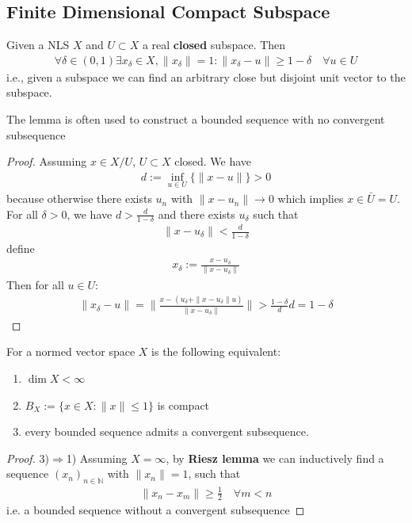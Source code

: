 \subsection{Finite Dimensional Compact Subspace}
\begin{lemma}
	Given a NLS $X$ and $U \subset X$ a real \textbf{closed} subspace. Then
	\begin{align*}
		\forall \delta \in (0, 1)\exists x_\delta \in X, \|x_\delta\| = 1: \|x_\delta - u\| \ge 1 - \delta \quad \forall u \in U
	\end{align*}
	i.e., given a subspace we can find an arbitrary close but disjoint unit vector to the subspace.
\end{lemma}
\begin{remark}
	The lemma is often used to construct a bounded sequence with no convergent subsequence
\end{remark}
\begin{proof}
	Assuming $x \in X\slash U$, $U \subset X$ closed. We have 
	\begin{align*}
		d:= \inf_{u \in U}\{\|x - u\|\} > 0
	\end{align*}
	because otherwise there exists $u_n$ with $\|x - u_n\| \rightarrow 0$ which implies $x \in \bar{U} = U$. For all $\delta > 0$, we have $d > \frac{d}{1 - \delta}$ and there exists $u_\delta$ such that
	\begin{align*}
		\|x - u_\delta\| < \frac{d}{1 - \delta}
	\end{align*}
	define 
	\begin{align*}
		x_\delta := \frac{x - u_\delta}{\|x - u_\delta\|}
	\end{align*}
	Then for all $u \in U$:
	\begin{align*}
		\|x_\delta - u\| = \bigg\| \frac{x - (u_\delta + \|x - u_\delta\| u) }{\|x - u_\delta\|} \bigg\| > \frac{1- \delta}{d} d = 1 - \delta
	\end{align*}
\end{proof}

\begin{theorem}
For a normed vector space $X$ is the following equivalent:
\begin{enumerate}
	\item $\dim X < \infty$
	\item $B_X:= \{x \in X: \|x\| \le  1\}$ is compact
	\item every bounded sequence admits a convergent subsequence.
\end{enumerate}
\end{theorem}
\begin{proof}
	3)$\Rightarrow$1) Assuming $X = \infty$, by \textbf{Riesz lemma} we can inductively find a sequence $(x_n)_{n \in \mathbb{N}}$ with $\|x_n\| = 1$, such that 
	\begin{align*}
		\|x_n - x_m\| \ge \frac{1}{2} \quad \forall m < n
	\end{align*}
	i.e. a bounded sequence without a convergent subsequence
\end{proof}



